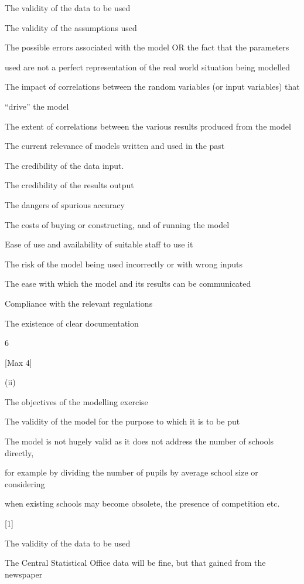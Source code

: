 \documentclass[a4paper,12pt]{article}
\begin{document}
The validity of the data to be used 

The validity of the assumptions used 

The possible errors associated with the model OR the fact that the parameters

used are not a perfect representation of the real world situation being modelled 

The impact of correlations between the random variables (or input variables) that

“drive” the model



The extent of correlations between the various results produced from the model 

The current relevance of models written and used in the past 

The credibility of the data input. 

The credibility of the results output 

The dangers of spurious accuracy 

The costs of buying or constructing, and of running the model 

Ease of use and availability of suitable staff to use it 

The risk of the model being used incorrectly or with wrong inputs 

The ease with which the model and its results can be communicated 

Compliance with the relevant regulations 

The existence of clear documentation

6

[Max 4]

(ii)

The objectives of the modelling exercise

The validity of the model for the purpose to which it is to be put

The model is not hugely valid as it does not address the number of schools directly,

for example by dividing the number of pupils by average school size or considering

when existing schools may become obsolete, the presence of competition etc.

[1]

The validity of the data to be used

The Central Statistical Office data will be fine, but that gained from the newspaper
\end{document}
